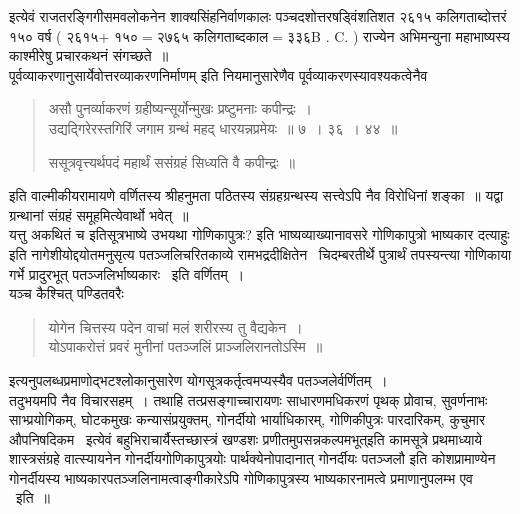 \documentclass[11pt, openany]{book}
\begin{document}
इत्येवं राजतरङ्गिगीसमवलोकनेन शाक्यसिंहनिर्वाणकालः पञ्चदशोत्तरषड्विंशतिशत २६१५ कलिगताब्दोत्तरं १५० वर्ष ( २६१५+ १५०$=$२७६५ कलिगताब्दकाल$=$३३६B . C. ) राज्येन अभिमन्युना महाभाष्यस्य काश्मीरेषु प्रचारकथनं संगच्छते~॥\\

पूर्वव्याकरणानुसार्येवोत्तरव्याकरणनिर्माणम् इति नियमानुसारेणैव पूर्वव्याकरणस्यावश्यकत्वेनैव \textendash\

\begin{quote}
{\qt असौ पुनर्व्याकरणं ग्रहीष्यन्सूर्योन्मुखः प्रष्टुमनाः कपीन्द्रः~।\\
उद्यद्गिरेरस्तगिरिं जगाम ग्रन्थं महद् धारयन्नप्रमेयः~॥ ७~। ३६~। ४४~॥ 

ससूत्रवृत्त्यर्थपदं महार्थं ससंग्रहं सिध्यति वै कपीन्द्रः~॥}
\end{quote}

इति वाल्मीकीयरामायणे वर्णितस्य श्रीहनुमता पठितस्य संग्रहग्रन्थस्य सत्त्वेऽपि नैव विरोधिनां शङ्का~॥ यद्वा ग्रन्थानां संग्रहं समूहमित्येवार्थो भवेत्~॥\\

यत्तु {\qt अकथितं च} इतिसूत्रभाष्ये {\qt उभयथा गोणिकापुत्रः}? इति भाष्यव्याख्यानावसरे गोणिकापुत्रो भाष्यकार दत्याहुः इति नागेशीयोद्दयोतमनुसृत्य पतञ्जलिचरितकाव्ये रामभद्रदीक्षितेन \textendash\ चिदम्बरतीर्थे पुत्रार्थं तपस्यन्त्या गोणिकाया गर्भे प्रादुरभूत् पतञ्जलिर्भाष्यकारः \textendash\ इति वर्णितम्~।\\

यञ्च कैश्चित् पण्डितवरैः \textendash\

\begin{quote}
{\qt योगेन चित्तस्य पदेन वाचां मलं शरीरस्य तु वैद्यकेन~।\\
योऽपाकरोत्तं प्रवरं मुनीनां पतञ्जलिं प्राञ्जलिरानतोऽस्मि~॥}
\end{quote}
 
इत्यनुपलब्धप्रमाणोद्भटश्लोकानुसारेण योगसूत्रकर्तृत्वमप्यस्यैव पतञ्जलेर्वर्णितम्~।\\

तदुभयमपि नैव विचारसहम्~। तथाहि तत्प्रसङ्गाच्चारायणः साधारणमधिकरणं पृथक् प्रोवाच, सुवर्णनाभः साभ्प्रयोगिकम्, घोटकमुखः कन्यासंप्रयुक्तम्, गोनर्दीयो भार्याधिकारम्, गोणिकीपुत्रः पारदारिकम्, कुचुमार औपनिषदिकम \textendash\ इत्येवं बहुभिराचार्यैस्तच्छास्त्रं खण्डशः प्रणीतमुपसन्नकल्पमभूत्{\qt इति कामसूत्रे प्रथमाध्याये शास्त्रसंग्रहे वात्स्यायनेन गोनर्दीयगोणिकापुत्रयोः पार्थक्येनोपादानात् }गोनर्दीयः पतञ्जलौ इति कोशप्रामाण्येन गोनर्दीयस्य भाष्यकारपतञ्जलिनामत्वाङ्गीकारेऽपि गोणिकापुत्रस्य भाष्यकारनामत्वे प्रमाणानुपलम्भ एव \textendash\ इति~॥\\
\end{document}
